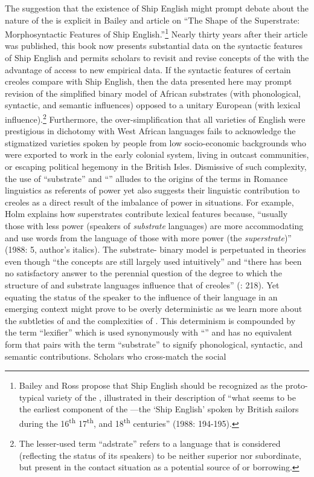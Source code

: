 The suggestion that the existence of Ship English might prompt debate about the nature of the  is explicit in Bailey and  article on “The Shape of the Superstrate: Morphosyntactic Features of Ship English.”\footnote{Bailey and Ross propose that Ship English should be recognized as the proto-typical variety of the , illustrated in their description of “what seems to be the earliest component of the —the ‘Ship English’ spoken by British sailors during the 16\textsuperscript{th} 17\textsuperscript{th}, and 18\textsuperscript{th} centuries” (1988: 194-195).}  Nearly thirty years after their article was published, this book now presents substantial data on the syntactic features of Ship English and permits scholars to revisit and revise concepts of the  with the advantage of access to new empirical data. If the syntactic features of certain creoles compare with Ship English, then the data presented here may prompt revision of the simplified binary model of African substrates (with phonological, syntactic, and semantic influences) opposed to a unitary European  (with lexical influence).\footnote{The lesser-used term “adstrate” refers to a language that is considered (reflecting the status of its speakers) to be neither superior nor subordinate, but present in the contact situation as a potential source of  or borrowing.}  Furthermore, the over-simplification that all varieties of English were prestigious in dichotomy with West African languages fails to acknowledge the stigmatized varieties spoken by people from low socio-economic backgrounds who were exported to work in the early colonial system, living in outcast communities, or escaping political hegemony in the British Isles. Dismissive of such complexity, the use of “substrate” and “” alludes to the origins of the terms in Romance linguistics as referents of power yet also suggests their linguistic contribution to creoles as a direct result of the imbalance of power in  situations. For example, Holm explains how superstrates contribute lexical features because, “usually those with less power (speakers of \textit{substrate} languages) are more accommodating and use words from the language of those with more power (the \textit{superstrate})” (1988: 5, author’s italics). The substrate- binary model is perpetuated in  theories even though “the concepts are still largely used intuitively” \citep[55]{Selbach2008} and “there has been no satisfactory answer to the perennial question of the degree to which the structure of  and substrate languages influence that of creoles” (\citealt{Holm2009}: 218). Yet equating the status of the speaker to the influence of their language in an emerging  context might prove to be overly deterministic as we learn more about the subtleties of  and the complexities of . This determinism is compounded by the term “lexifier” which is used synonymously with “” and has no equivalent form that pairs with the term “substrate” to signify phonological, syntactic, and semantic contributions. Scholars who cross-match the social 